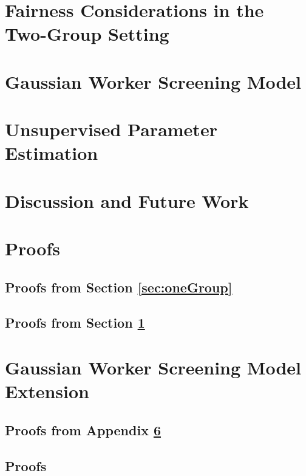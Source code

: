 \documentclass{article}
\begin{document}
\section{Fairness Considerations in the Two-Group Setting}
\label{sec:twoGroups}



\section{Gaussian Worker Screening Model}
\label{sec:gaussian}


\label{sec:gaussianTwoGroups}



\section{Unsupervised Parameter Estimation}
\label{sec:unsupervised}



\section{Discussion and Future Work}
\label{sec:Summary}


\newpage



\newpage
\appendix

\section{ Proofs}
\label{sec:proofs}

\subsection{Proofs from Section \ref{sec:oneGroup}}
\label{app:oneGroup}


\subsection{Proofs from Section \ref{sec:twoGroups}}
\label{app:twoGroups}


\section{Gaussian Worker Screening Model Extension}
\label{app:gaussianExtended}


\subsection{Proofs from Appendix \ref{app:gaussianExtended}}
\label{app:gaussian}


\subsection{Proofs}
\label{app:gaussianTwoGroups}

\end{document}
